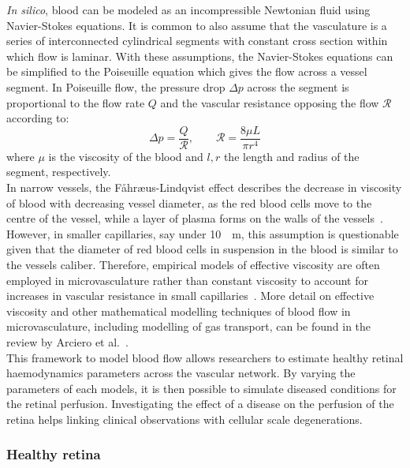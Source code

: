\documentclass[12pt,a4paper]{article}
\begin{document}
\textit{In silico}, blood can be modeled as an incompressible Newtonian fluid using Navier-Stokes equations.
It is common to also assume that the vasculature is a series of interconnected cylindrical segments with constant cross section within which flow is laminar.
With these assumptions, the Navier-Stokes equations can be simplified to the Poiseuille equation which gives the flow across a vessel segment.
In Poiseuille flow, the pressure drop $\Delta p$ across the segment is proportional to the flow rate $Q$ and the vascular resistance opposing the flow $\mathcal{R}$ according to:
\begin{equation}
  \label{eq:PoiseuilleLaw}
  \Delta p = \frac{Q}{\mathcal{R}}, \qquad \mathcal{R} = \frac{8\mu L}{\pi r^4} 
\end{equation}
where $\mu$ is the viscosity of the blood and $l, r$ the length and radius of the segment, respectively.\\
In narrow vessels, the F\r{a}hr\ae us-Lindqvist effect describes the decrease in viscosity of blood with decreasing vessel diameter, as the red blood cells move to the centre of the vessel, while a layer of plasma forms on the walls of the vessels~\cite{F_hr_us_1931}.
However, in smaller capillaries, say under \SI{10}{\mu\meter}, this assumption is questionable given that the diameter of red blood cells in suspension in the blood is similar to the vessels caliber.
Therefore, empirical models of effective viscosity are often employed in microvasculature rather than constant viscosity to account for increases in vascular resistance in small capillaries~\cite{Pries_1990, Haynes_1960}.
More detail on effective viscosity and other mathematical modelling techniques of blood flow in microvasculature, including modelling of gas transport, can be found in the review by Arciero et al.~\cite{C_Arciero_2017}. \\
This framework to model blood flow allows researchers to estimate healthy retinal haemodynamics parameters across the vascular network.
By varying the parameters of each models, it is then possible to simulate diseased conditions for the retinal perfusion.
Investigating the effect of a disease on the perfusion of the retina helps linking clinical observations with cellular scale degenerations.


\subsubsection{Healthy retina}
\end{document}
